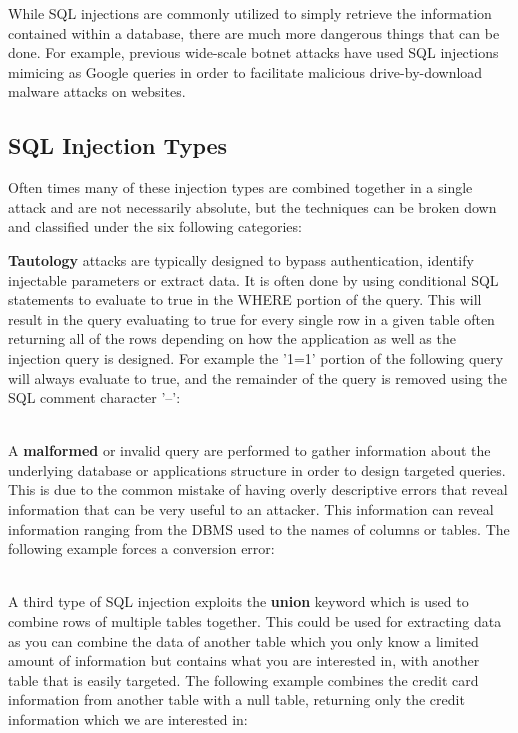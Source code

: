 While SQL injections are commonly utilized to simply retrieve the information contained within a database, there are much more dangerous  things that can be done.  For example, previous wide-scale botnet attacks have used SQL injections mimicing as Google queries in order to facilitate malicious drive-by-download malware attacks on websites. \cite{aSurveyOnWeb}

\subsection{SQL Injection Types}\label{sec:sqliTypes}

Often times many of these injection types are combined together in a single attack and are not necessarily absolute, but the techniques can be broken down and classified under the six following categories:

\textbf{Tautology} attacks are typically designed to bypass authentication, identify injectable parameters or extract data.  It is often done by using conditional SQL statements to evaluate to true in the WHERE portion of the query.  This will result in the query evaluating to true for every single row in a given table often returning all of the rows depending on how the application as well as the injection query is designed. For example the '1=1' portion of the following query will always evaluate to true, and the remainder of the query is removed using the SQL comment character '--':

\noindent
{}
\\

A \textbf{malformed} or invalid query are performed to gather information about the underlying database or applications structure in order to design targeted queries.  This is due to the common mistake of having overly descriptive errors that reveal information that can be very useful to an attacker. This information can reveal information ranging from the DBMS used to the names of columns or tables.  The following example forces a conversion error:

\noindent
{}
\\

A third type of SQL injection exploits the \textbf{union} keyword which is used to combine rows of multiple tables together.  This could be used for extracting data as you can combine the data of another table which you only know a limited amount of information but contains what you are interested in, with another table that is easily targeted.  The following example combines the credit card information from another table with a null table, returning only the credit information which we are interested in:

